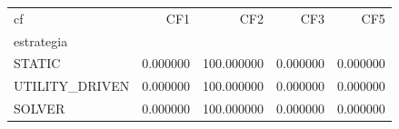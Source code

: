\begin{tabular}{lrrrr}
\toprule
cf & CF1 & CF2 & CF3 & CF5 \\
estrategia &  &  &  &  \\
\midrule
STATIC & 0.000000 & 100.000000 & 0.000000 & 0.000000 \\
UTILITY_DRIVEN & 0.000000 & 100.000000 & 0.000000 & 0.000000 \\
SOLVER & 0.000000 & 100.000000 & 0.000000 & 0.000000 \\
\bottomrule
\end{tabular}
